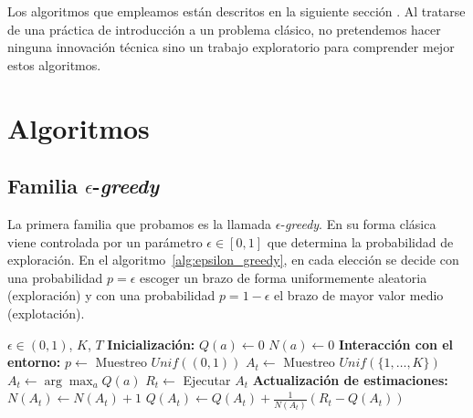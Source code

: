 Los algoritmos que empleamos están descritos en la siguiente sección \cite{sutton2018}. Al tratarse de una práctica de introducción a un problema clásico, no pretendemos hacer ninguna innovación técnica sino un trabajo exploratorio para comprender mejor estos algoritmos.



\section{Algoritmos}


\subsection{Familia $\epsilon$-\textit{greedy}}

La primera familia que probamos es la llamada $\epsilon$-\textit{greedy}. En su forma clásica viene controlada por un parámetro $\epsilon\in[0,1]$ que determina la probabilidad de exploración. En el algoritmo~\ref{alg:epsilon_greedy}, en cada elección se decide con una probabilidad $p=\epsilon$ escoger un brazo de forma uniformemente aleatoria (exploración) y con una probabilidad $p=1-\epsilon$ el brazo de mayor valor medio (explotación).

\begin{algorithm}[H]
\caption{$\epsilon$-\textit{greedy}}
\label{alg:epsilon_greedy}
\begin{algorithmic}[1]
\Require $\epsilon \in (0,1)$, $K$, $T$
\State \textbf{Inicialización:}
    \State $Q(a) \leftarrow 0$ 
    \State $N(a) \leftarrow 0$ 
\EndFor
\State \textbf{Interacción con el entorno:}
    \State $p \leftarrow$ Muestreo $Unif((0,1))$ 
        \State $A_t \leftarrow$ Muestreo $Unif(\{1, \dots, K\})$ 
    \Else
        \State $A_t \leftarrow \arg\max_{a} Q(a)$ 
    \EndIf
    \State $R_t \leftarrow$ Ejecutar $A_t$
    \State \textbf{Actualización de estimaciones:}
    \State $N(A_t) \leftarrow N(A_t) + 1$
    \State $Q(A_t) \leftarrow Q(A_t) + \frac{1}{N(A_t)} \left( R_t - Q(A_t) \right)$
\EndFor
\end{algorithmic}
\end{algorithm}

